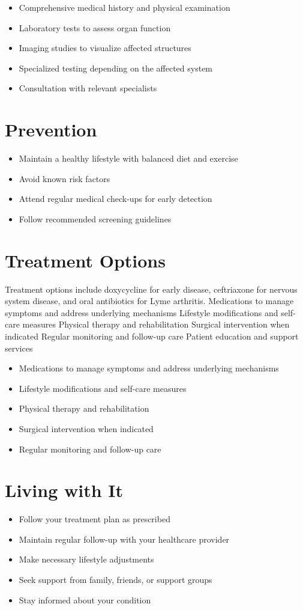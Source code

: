 \begin{itemize}[noitemsep]
  \item Comprehensive medical history and physical examination
  \item Laboratory tests to assess organ function
  \item Imaging studies to visualize affected structures
  \item Specialized testing depending on the affected system
  \item Consultation with relevant specialists
\end{itemize}
\section{Prevention}
\begin{itemize}[noitemsep]
  \item Maintain a healthy lifestyle with balanced diet and exercise
  \item Avoid known risk factors
  \item Attend regular medical check-ups for early detection
  \item Follow recommended screening guidelines
\end{itemize}
\section{Treatment Options}
Treatment options include doxycycline for early disease, ceftriaxone for nervous system disease, and oral antibiotics for Lyme arthritis. Medications to manage symptoms and address underlying mechanisms Lifestyle modifications and self-care measures Physical therapy and rehabilitation Surgical intervention when indicated Regular monitoring and follow-up care Patient education and support services

\begin{itemize}[noitemsep]
  \item Medications to manage symptoms and address underlying mechanisms
  \item Lifestyle modifications and self-care measures
  \item Physical therapy and rehabilitation
  \item Surgical intervention when indicated
  \item Regular monitoring and follow-up care
\end{itemize}
\section{Living with It}
\begin{itemize}[noitemsep]
  \item Follow your treatment plan as prescribed
  \item Maintain regular follow-up with your healthcare provider
  \item Make necessary lifestyle adjustments
  \item Seek support from family, friends, or support groups
  \item Stay informed about your condition
\end{itemize}
